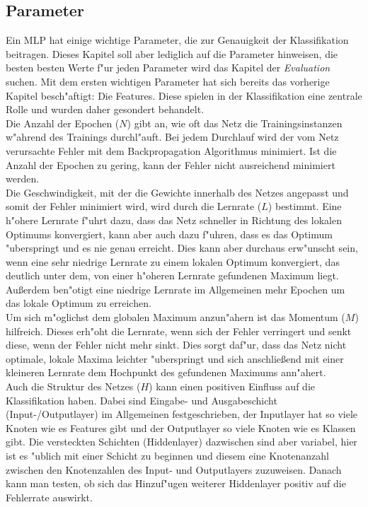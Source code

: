 \subsection{Parameter}
\label{Parameter}
Ein MLP hat einige wichtige Parameter, die zur Genauigkeit der Klassifikation beitragen. Dieses Kapitel soll aber lediglich auf die Parameter hinweisen, die besten besten Werte f"ur jeden Parameter wird das Kapitel der \textit{Evaluation} suchen. Mit dem ersten wichtigen Parameter hat sich bereits das vorherige Kapitel besch"aftigt: Die Features. Diese spielen in der Klassifikation eine zentrale Rolle und wurden daher gesondert behandelt.\\
Die Anzahl der Epochen ($N$) gibt an, wie oft das Netz die Trainingsinstanzen w"ahrend des Trainings durchl"auft. Bei jedem Durchlauf wird der vom Netz verursachte Fehler mit dem Backpropagation Algorithmus minimiert. Ist die Anzahl der Epochen zu gering, kann der Fehler nicht ausreichend minimiert werden. \\
Die Geschwindigkeit, mit der die Gewichte innerhalb des Netzes angepasst und somit der Fehler minimiert wird, wird durch die Lernrate ($L$) bestimmt. Eine h"ohere Lernrate f"uhrt dazu, dass das Netz schneller in Richtung des lokalen Optimums konvergiert, kann aber auch dazu f"uhren, dass es das Optimum "uberspringt und es nie genau erreicht. Dies kann aber durchaus erw"unscht sein, wenn eine sehr niedrige Lernrate zu einem lokalen Optimum konvergiert, das deutlich unter dem, von einer h"oheren Lernrate gefundenen Maximum liegt. Au{\ss}erdem ben"otigt eine niedrige Lernrate im Allgemeinen mehr Epochen um das lokale Optimum zu erreichen. \\
Um sich m"oglichst dem globalen Maximum anzun"ahern ist das Momentum ($M$) hilfreich. Dieses erh"oht die Lernrate, wenn sich der Fehler verringert und senkt diese, wenn der Fehler nicht mehr sinkt. Dies sorgt daf"ur, dass das Netz nicht optimale, lokale Maxima leichter "uberspringt und sich anschlie{\ss}end mit einer kleineren Lernrate dem Hochpunkt des gefundenen Maximums ann"ahert.\\
Auch die Struktur des Netzes ($H$) kann einen positiven Einfluss auf die Klassifikation haben. Dabei sind Eingabe- und Ausgabeschicht (Input-/Outputlayer) im Allgemeinen festgeschrieben, der Inputlayer hat so viele Knoten wie es Features gibt und der Outputlayer so viele Knoten wie es Klassen gibt. Die versteckten Schichten (Hiddenlayer) dazwischen sind aber variabel, hier ist es "ublich mit einer Schicht zu beginnen und diesem eine Knotenanzahl zwischen den Knotenzahlen des Input- und Outputlayers zuzuweisen. Danach kann man testen, ob sich das Hinzuf"ugen weiterer Hiddenlayer positiv auf die Fehlerrate auswirkt.\\
